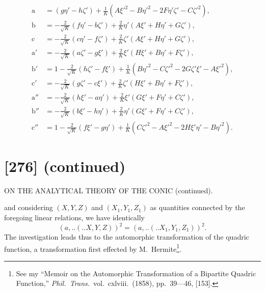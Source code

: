 \documentclass[12pt,a4paper]{article}
\newcommand{\qform}[2]{(#1 \mathbin{..} #2)}
\theoremstyle{definition}
\begin{document}
\begin{align*}
\mathrm{a} &= (g\eta' - h\zeta') + \tfrac{1}{K}(A\xi'^{2} - B\eta'^{2} - 2F\eta'\zeta' - C\zeta'^{2}),\\
\mathrm{b} &= -\tfrac{2}{\sqrt{K}}(f\eta' - b\zeta') + \tfrac{2}{K}\eta'(A\xi' + H\eta' + G\zeta'),\\
\mathrm{c} &= -\tfrac{2}{\sqrt{K}}(c\eta' - f\zeta') + \tfrac{2}{K}\zeta'(A\xi' + H\eta' + G\zeta'),\\
\mathrm{a}' &= -\tfrac{2}{\sqrt{K}}(a\zeta' - g\xi') + \tfrac{2}{K}\xi'(H\xi' + B\eta' + F\zeta'),\\
\mathrm{b}' &= 1 - \tfrac{2}{\sqrt{K}}(h\zeta' - f\xi') + \tfrac{1}{K}(B\eta'^{2} - C\zeta'^{2} - 2G\zeta'\xi' - A\xi'^{2}),\\
\mathrm{c}' &= -\tfrac{2}{\sqrt{K}}(g\zeta' - c\xi') + \tfrac{2}{K}\zeta'(H\xi' + B\eta' + F\zeta'),\\
\mathrm{a}'' &= -\tfrac{2}{\sqrt{K}}(h\xi' - a\eta') + \tfrac{2}{K}\xi'(G\xi' + F\eta' + C\zeta'),\\
\mathrm{b}'' &= -\tfrac{2}{\sqrt{K}}(b\xi' - h\eta') + \tfrac{2}{K}\eta'(G\xi' + F\eta' + C\zeta'),\\
\mathrm{c}'' &= 1 - \tfrac{2}{\sqrt{K}}(f\xi' - g\eta') + \tfrac{1}{K}(C\zeta'^{2} - A\xi'^{2} - 2H\xi'\eta' - B\eta'^{2}).
\end{align*}

\newpage
\section*{[276] (continued)}
\begin{center}
{\large ON THE ANALYTICAL THEORY OF THE CONIC (continued).}
\end{center}

and considering $(X, Y, Z)$ and $(X_{1}, Y_{1}, Z_{1})$ as quantities connected by the foregoing linear relations, we have identically
\[
(a,..\!\qform{}{X, Y, Z})^{2} = (a,..\!\qform{}{X_{1}, Y_{1}, Z_{1}})^{2}.
\]
The investigation leads thus to the automorphic transformation of the quadric function, a transformation first effected by M.~Hermite\footnote{See my ``Memoir on the Automorphic Transformation of a Bipartite Quadric Function,'' \textit{Phil.\ Trans.}\ vol.~cxlviii.\ (1858), pp.~39---46, [153].}.
\end{document}
